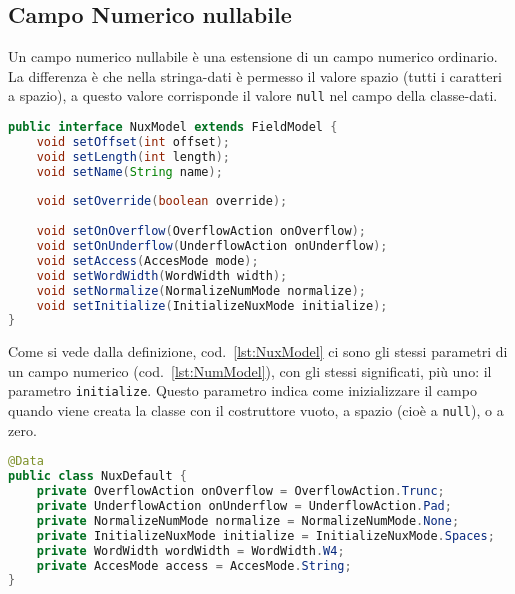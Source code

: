 \documentclass[a4paper,10pt]{report}
\begin{document}
\subsection{Campo Numerico nullabile}
Un campo numerico nullabile è una estensione di un campo numerico ordinario.
La differenza è che nella stringa-dati è permesso il valore spazio (tutti i
caratteri a spazio), a questo valore corrisponde il valore \verb!null! nel 
campo della classe-dati.

\begin{figure*}[!htb]
\begin{lstlisting}[language=java, 
caption=interfaccia NuxModel (campo numerico nullabile), 
label=lst:NuxModel]
public interface NuxModel extends FieldModel {
    void setOffset(int offset);
    void setLength(int length);
    void setName(String name);
    
    void setOverride(boolean override);
    
    void setOnOverflow(OverflowAction onOverflow);
    void setOnUnderflow(UnderflowAction onUnderflow);
    void setAccess(AccesMode mode);
    void setWordWidth(WordWidth width);
    void setNormalize(NormalizeNumMode normalize);
    void setInitialize(InitializeNuxMode initialize);
}
\end{lstlisting}
\end{figure*}

Come si vede dalla definizione, cod.~\ref{lst:NuxModel} ci sono gli stessi
parametri di un campo numerico (cod.~\ref{lst:NumModel}), con gli stessi 
significati, più uno: il parametro \verb!initialize!.
Questo parametro indica come inizializzare il campo quando viene creata la
classe con il costruttore vuoto, a spazio (cioè a \verb!null!), o a zero.

\begin{figure*}[!htb]
\begin{lstlisting}[language=java, 
caption=class NuxDefault (default campo numerico nullabile), 
label=lst:NuxDefault]
@Data
public class NuxDefault {
    private OverflowAction onOverflow = OverflowAction.Trunc;
    private UnderflowAction onUnderflow = UnderflowAction.Pad;
    private NormalizeNumMode normalize = NormalizeNumMode.None;
    private InitializeNuxMode initialize = InitializeNuxMode.Spaces;
    private WordWidth wordWidth = WordWidth.W4;
    private AccesMode access = AccesMode.String;
}
\end{lstlisting}
\end{figure*}
\end{document}
